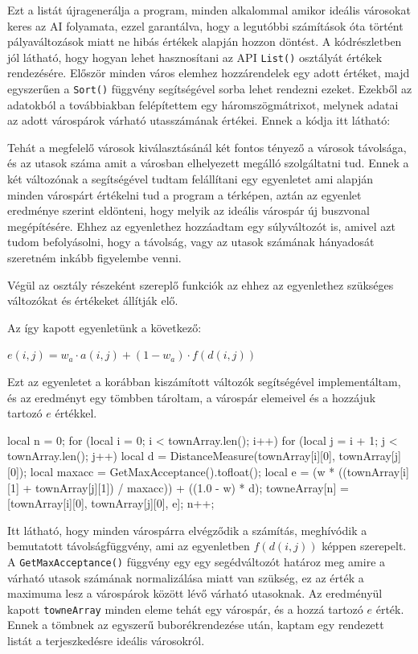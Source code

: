 Ezt a listát újragenerálja a program, minden alkalommal amikor ideális városokat keres az AI folyamata, ezzel garantálva, hogy a legutóbbi számítások óta történt pályaváltozások miatt ne hibás értékek alapján hozzon döntést. A kódrészletben jól látható, hogy hogyan lehet hasznosítani az API \texttt{List()} osztályát értékek rendezésére. Először minden város elemhez hozzárendelek egy adott értéket, majd egyszerűen a \texttt{Sort()} függvény segítségével sorba lehet rendezni ezeket. Ezekből az adatokból a továbbiakban felépítettem egy háromszögmátrixot, melynek adatai az adott várospárok várható utasszámának értékei. Ennek a kódja itt látható:

Tehát a megfelelő városok kiválasztásánál két fontos tényező a városok távolsága, és az utasok száma amit a városban elhelyezett megálló szolgáltatni tud. Ennek a két változónak a segítségével tudtam felállítani egy egyenletet ami alapján minden várospárt értékelni tud a program a térképen, aztán az egyenlet eredménye szerint eldönteni, hogy melyik az ideális várospár új buszvonal megépítésére. Ehhez az egyenlethez hozzáadtam egy súlyváltozót is, amivel azt tudom befolyásolni, hogy a távolság, vagy az utasok számának hányadosát szeretném inkább figyelembe venni.

Végül az osztály részeként szereplő funkciók az ehhez az egyenlethez szükséges változókat és értékeket állítják elő.

Az így kapott egyenletünk a következő:
\begin{center}
	$ e(i,j)=w_{a} \cdot a(i,j)+(1-w_{a}) \cdot f(d(i,j)) $
\end{center}

Ezt az egyenletet a korábban kiszámított változók segítségével implementáltam, és az eredményt egy tömbben tároltam, a várospár elemeivel és a hozzájuk tartozó $e$ értékkel.

\begin{cpp}
local n = 0;
for (local i = 0; i < townArray.len(); i++) {
  for (local j = i + 1; j < townArray.len(); j++) {
    local d = DistanceMeasure(townArray[i][0], townArray[j][0]);
    local maxacc = GetMaxAcceptance().tofloat();
    local e = (w * ((townArray[i][1] + townArray[j][1]) / maxacc))
      + ((1.0 - w) * d);
    towneArray[n] = [townArray[i][0], townArray[j][0], e];
    n++;
  }
}
\end{cpp}

Itt látható, hogy minden várospárra elvégződik a számítás, meghívódik a bemutatott távolságfüggvény, ami az egyenletben $f(d(i,j))$ képpen szerepelt. A \texttt{GetMaxAcceptance()} függvény egy egy segédváltozót határoz meg amire a várható utasok számának normalizálása miatt van szükség, ez az érték a maximuma lesz a várospárok között lévő várható utasoknak. Az eredményül kapott \texttt{towneArray} minden eleme tehát egy várospár, és a hozzá tartozó $e$ érték. Ennek a tömbnek az egyszerű buborékrendezése után, kaptam egy rendezett listát a terjeszkedésre ideális városokról.

